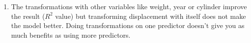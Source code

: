 \begin{enumerate}
	\item The transformations with other variables like weight, year or cylinder improve the result ($R^2$ value) but transforming displacement with itself does not make the model better. Doing transformations on one predictor doesn't give you as much benefits as using more predictors. 
	
\end{enumerate}  


